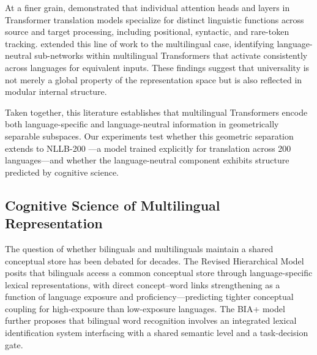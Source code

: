 At a finer grain, \citet{voita2019,voita2021} demonstrated that individual attention heads and layers in Transformer translation models specialize for distinct linguistic functions across source and target processing, including positional, syntactic, and rare-token tracking.
\citet{foroutan2022} extended this line of work to the multilingual case, identifying language-neutral sub-networks within multilingual Transformers that activate consistently across languages for equivalent inputs.
These findings suggest that universality is not merely a global property of the representation space but is also reflected in modular internal structure.

Taken together, this literature establishes that multilingual Transformers encode both language-specific and language-neutral information in geometrically separable subspaces.
Our experiments test whether this geometric separation extends to NLLB-200 \citep{nllbteam2022,goyal2022}---a model trained explicitly for translation across 200 languages---and whether the language-neutral component exhibits structure predicted by cognitive science.

\subsection{Cognitive Science of Multilingual Representation}

The question of whether bilinguals and multilinguals maintain a shared conceptual store has been debated for decades.
The Revised Hierarchical Model \citep{kroll1994,kroll2010} posits that bilinguals access a common conceptual store through language-specific lexical representations, with direct concept--word links strengthening as a function of language exposure and proficiency—predicting tighter conceptual coupling for high-exposure than low-exposure languages.
The BIA+ model \citep{dijkstra2002} further proposes that bilingual word recognition involves an integrated lexical identification system interfacing with a shared semantic level and a task-decision gate.

